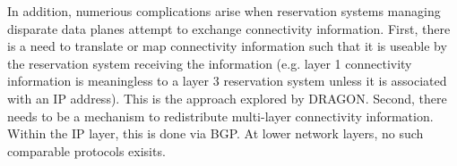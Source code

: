 \documentclass[conference]{IEEEtran}
\begin{document}
In addition, numerious complications arise when reservation systems managing disparate data planes attempt to exchange connectivity information.  First, there is a need to translate or map  connectivity information such that it is useable by the reservation system receiving the information (e.g. layer 1 connectivity information is meaningless to a layer 3 reservation system unless it is associated with an IP address).  This is the approach explored by DRAGON.  Second, there needs to be a mechanism to redistribute multi-layer connectivity information. Within the IP layer, this is done via BGP.  At lower network layers, no such comparable protocols exisits.


%


%
\end{document}

